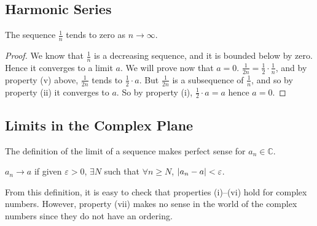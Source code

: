 \subsection{Harmonic Series}
\begin{lemma}
	The sequence \(\frac{1}{n}\) tends to zero as \(n \to \infty\).
\end{lemma}
\begin{proof}
	We know that \(\frac{1}{n}\) is a decreasing sequence, and it is bounded below by zero. Hence it converges to a limit \(a\). We will prove now that \(a = 0\). \(\frac{1}{2n} = \frac{1}{2}\cdot \frac{1}{n}\), and by property (v) above, \(\frac{1}{2n}\) tends to \(\frac{1}{2}\cdot a\). But \(\frac{1}{2n}\) is a subsequence of \(\frac{1}{n}\), and so by property (ii) it converges to \(a\). So by property (i), \(\frac{1}{2} \cdot a = a\) hence \(a=0\).
\end{proof}

\subsection{Limits in the Complex Plane}
\begin{remark}
	The definition of the limit of a sequence makes perfect sense for \(a_n \in \mathbb C\).
\end{remark}
\begin{definition}
	\(a_n \to a\) if given \(\varepsilon > 0\), \(\exists N\) such that \(\forall n \geq N\), \(\abs{a_n - a} < \varepsilon\).
\end{definition}
From this definition, it is easy to check that properties (i)--(vi) hold for complex numbers. However, property (vii) makes no sense in the world of the complex numbers since they do not have an ordering.
